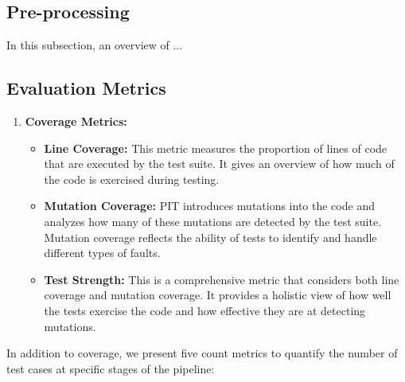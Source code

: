 \vspace{0.1 cm}
\subsection{Pre-processing}
\label{sec:preprocessing_ev}
\vspace{0.1 cm}

In this subsection, an overview of ...

\vspace{0.1 cm}
\subsection{Evaluation Metrics}
\label{sec:evaluation_metrics}
\vspace{0.1 cm}

    \begin{enumerate}
        \item \textbf{Coverage Metrics:}
        \begin{itemize}
            \item \textbf{Line Coverage:} This metric measures the proportion of lines of code that are executed by the test suite. It gives an overview of how much of the code is exercised during testing.
            \item \textbf{Mutation Coverage:} PIT introduces mutations into the code and analyzes how many of these mutations are detected by the test suite. Mutation coverage reflects the ability of tests to identify and handle different types of faults.
            \item \textbf{Test Strength:} This is a comprehensive metric that considers both line coverage and mutation coverage. It provides a holistic view of how well the tests exercise the code and how effective they are at detecting mutations.
        \end{itemize}
    \end{enumerate}

    In addition to coverage, we present five count metrics to quantify the number of test cases at specific stages of the pipeline:

